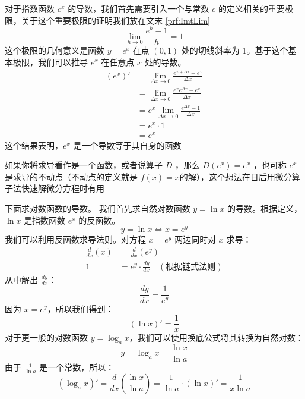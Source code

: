 \documentclass[lang=cn,newtx,10pt,scheme=chinese]{elegantbook}
\begin{document}
\begin{example}
  对于指数函数 $e^x$ 的导数，我们首先需要引入一个与常数 $e$ 的定义相关的重要极限，关于这个重要极限的证明我们放在文末 \ref{prf:ImtLim}
  \begin{equation}
    \lim_{h \to 0} \frac{e^h - 1}{h} = 1
  \end{equation}
  这个极限的几何意义是函数 $y=e^x$ 在点 $(0,1)$ 处的切线斜率为 1。基于这个基本极限，我们可以推导 $e^x$ 在任意点 $x$ 处的导数。
  \begin{equation}
    \begin{aligned}
      (e^x)' &= \lim_{\Delta x \to 0} \frac{e^{x+\Delta x} - e^x}{\Delta x} \\
      &= \lim_{\Delta x \to 0} \frac{e^x e^{\Delta x} - e^x}{\Delta x} \\
      &= e^x \lim_{\Delta x \to 0} \frac{e^{\Delta x} - 1}{\Delta x} \\
      &= e^x \cdot 1 \\
      &= e^x
    \end{aligned}
  \end{equation}
  这个结果表明，$e^x$ 是一个导数等于其自身的函数

  如果你将求导看作是一个函数，或者说算子 $D$ ，那么 $D(e^{x} )=e^{x}  $ ，也可称 $e^{x}$ 是求导的不动点（不动点的定义就是 $f(x)=x$的解），这个想法在日后用微分算子法快速解微分方程时有用
\end{example}
\begin{example}
  下面求对数函数的导数。
  我们首先求自然对数函数 $y = \ln x$ 的导数。根据定义，$\ln x$ 是指数函数 $e^x$ 的反函数。
  \begin{equation}
    y = \ln x \iff x = e^y
  \end{equation}
  我们可以利用反函数求导法则。对方程 $x = e^y$ 两边同时对 $x$ 求导：
  \begin{equation}
    \begin{aligned}
      \frac{d}{dx}(x) &= \frac{d}{dx}(e^y) \\
      1 &= e^y \cdot \frac{dy}{dx} \quad (\text{根据链式法则})
    \end{aligned}
  \end{equation}
  从中解出 $\frac{dy}{dx}$：
  \begin{equation}
    \frac{dy}{dx} = \frac{1}{e^y}
  \end{equation}
  因为 $x = e^y$，所以我们得到：
  \begin{equation}
    (\ln x)' = \frac{1}{x}
  \end{equation}
  对于更一般的对数函数 $y = \log_a x$，我们可以使用换底公式将其转换为自然对数：
  \begin{equation}
    y = \log_a x = \frac{\ln x}{\ln a}
  \end{equation}
  由于 $\frac{1}{\ln a}$ 是一个常数，所以：
  \begin{equation}
    (\log_a x)' = \frac{d}{dx}\left(\frac{\ln x}{\ln a}\right) = \frac{1}{\ln a} \cdot (\ln x)' = \frac{1}{x \ln a}
  \end{equation}
\end{example}
\end{document}
